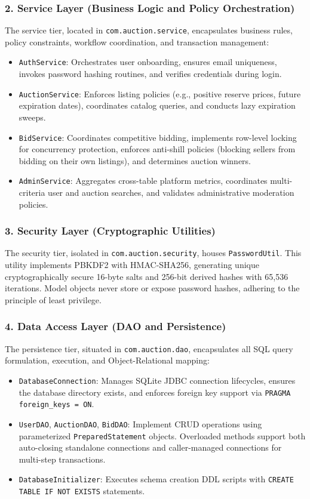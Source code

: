 \subsubsection{2. Service Layer (Business Logic and Policy Orchestration)}
The service tier, located in \texttt{com.auction.service}, encapsulates business rules, policy constraints, workflow coordination, and transaction management:
\begin{itemize}
    \item \texttt{AuthService}: Orchestrates user onboarding, ensures email uniqueness, invokes password hashing routines, and verifies credentials during login.
    \item \texttt{AuctionService}: Enforces listing policies (e.g., positive reserve prices, future expiration dates), coordinates catalog queries, and conducts lazy expiration sweeps.
    \item \texttt{BidService}: Coordinates competitive bidding, implements row-level locking for concurrency protection, enforces anti-shill policies (blocking sellers from bidding on their own listings), and determines auction winners.
    \item \texttt{AdminService}: Aggregates cross-table platform metrics, coordinates multi-criteria user and auction searches, and validates administrative moderation policies.
\end{itemize}

\subsubsection{3. Security Layer (Cryptographic Utilities)}
The security tier, isolated in \texttt{com.auction.security}, houses \texttt{PasswordUtil}. This utility implements PBKDF2 with HMAC-SHA256, generating unique cryptographically secure 16-byte salts and 256-bit derived hashes with 65,536 iterations. Model objects never store or expose password hashes, adhering to the principle of least privilege.

\subsubsection{4. Data Access Layer (DAO and Persistence)}
The persistence tier, situated in \texttt{com.auction.dao}, encapsulates all SQL query formulation, execution, and Object-Relational mapping:
\begin{itemize}
    \item \texttt{DatabaseConnection}: Manages SQLite JDBC connection lifecycles, ensures the database directory exists, and enforces foreign key support via \texttt{PRAGMA foreign\_keys = ON}.
    \item \texttt{UserDAO}, \texttt{AuctionDAO}, \texttt{BidDAO}: Implement CRUD operations using parameterized \texttt{PreparedStatement} objects. Overloaded methods support both auto-closing standalone connections and caller-managed connections for multi-step transactions.
    \item \texttt{DatabaseInitializer}: Executes schema creation DDL scripts with \texttt{CREATE TABLE IF NOT EXISTS} statements.
\end{itemize}

